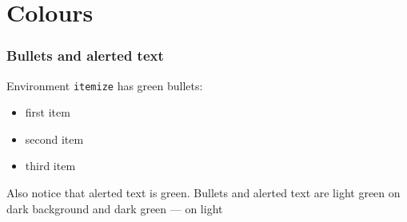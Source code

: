 \section{Colours}

\sectionframe	%

\begin{frame}[fragile]
\frametitle{Bullets and alerted text}
Environment \verb"itemize" has green bullets:
\begin{itemize}
	\item first item
	\item second item
	\item third item
\end{itemize}

Also notice that \alert{alerted} text is green. Bullets and alerted text are {\color{tpugreen}light green} on dark background and {\color{tpudarkgreen}dark green} --- on light
\end{frame}
